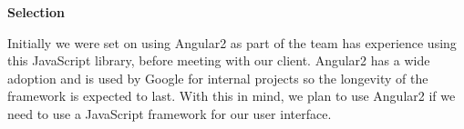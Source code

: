 \documentclass[letterpaper, 10pt, draftclsnofoot, compsoc, onecolumn]{IEEEtran}
\begin{document}
{\medskip
{\noindent\rmfamily\bfseries\color{black} Selection \par}
{\noindent Initially we were set on using Angular2 as part of the team has experience using this JavaScript library, before meeting with our client. Angular2 has a wide adoption and is used by Google for internal projects so the longevity of the framework is expected to last. With this in mind, we plan to use Angular2 if we need to use a JavaScript framework for our user interface. \par}



\begin{comment}
\newpage
\subsubsection{Documentation}
{\noindent Option 1 - Microsoft Word \cite{Word} \par}
{\noindent  Microsoft Word is a fairly powerful and widespread software that is often used for documentation outside of higher education and the technology industry. \par}

\medskip
{\noindent Option 2 - Dozuki \cite{Dozuki} \par}
{\noindent Integrates revisions, approval, and documentation into a single system that allows for efficient work-flows for creating customizable and centrally managed documentation. \par}

\medskip
{\noindent Option 3 - LaTeX \cite{Latex} \par}
{\noindent  LaTeX, hereby known as Latex, is a document preparation system often used in the technical and scientific fields for documentation, and is the de facto standard for communication and publication of scientific documents \cite{Latex}. \par}

\medskip
{\noindent\rmfamily\bfseries\color{black} Goals \par}
{\noindent An efficient documentation solution that is able to provide the ability to create beautiful and useful documentation of  the platform. This documentation will assist the end user with operation of the various parts of the platform.\par}

\medskip
\newpage
{\noindent\rmfamily\bfseries\color{black} Evaluation Criteria \par}
{\noindent The options are evaluated on


\end{comment}}
\end{document}
